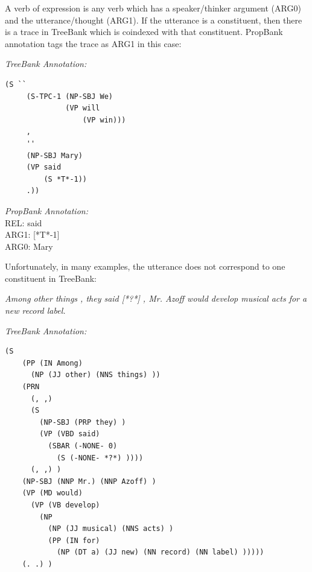 \documentclass[11pt]{report}
\begin{document}
A verb of expression is any verb which has a speaker/thinker argument (ARG0) and the utterance/thought (ARG1).  If the utterance is a constituent, then there is a trace in TreeBank which is coindexed with that constituent. PropBank annotation tags the trace as ARG1 in this case:

\textit{TreeBank Annotation:}
\begin{verbatim}
(S ``
     (S-TPC-1 (NP-SBJ We)
              (VP will
                  (VP win)))
     ,
     ''
     (NP-SBJ Mary)
     (VP said
         (S *T*-1))
     .))
\end{verbatim}

\textit{PropBank Annotation:}\\
REL: said\\
ARG1:  [*T*-1]\\ 
ARG0: Mary

Unfortunately, in many examples, the utterance does not correspond to one constituent in TreeBank:  

\textit{Among other things , they said  [*?*] , Mr. Azoff would develop musical acts for a new record label.}

\textit{TreeBank Annotation:}
\begin{verbatim}
(S 
    (PP (IN Among) 
      (NP (JJ other) (NNS things) ))
    (PRN 
      (, ,)
      (S 
        (NP-SBJ (PRP they) )
        (VP (VBD said) 
          (SBAR (-NONE- 0) 
            (S (-NONE- *?*) ))))
      (, ,) )
    (NP-SBJ (NNP Mr.) (NNP Azoff) )
    (VP (MD would) 
      (VP (VB develop) 
        (NP 
          (NP (JJ musical) (NNS acts) )
          (PP (IN for) 
            (NP (DT a) (JJ new) (NN record) (NN label) )))))
    (. .) )
\end{verbatim}
\end{document}
